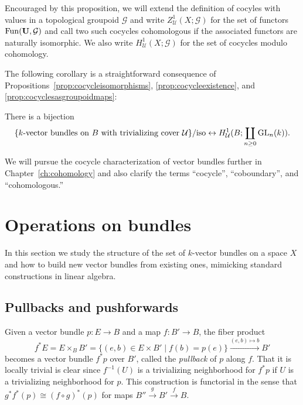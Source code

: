 \documentclass[a4paper,openany]{scrbook}
\begin{document}
Encouraged by this proposition, we will extend the definition of cocyles with values in a topological groupoid $\mathcal G$ and write $Z^1_{\mathcal U}(X;\mathcal G)$ for the set of functors $\operatorname{Fun}(\mathbf U,\mathcal G)$ and call two such cocycles cohomologous if the associated functors are naturally isomorphic. We also write $H^1_{\mathcal U}(X;\mathcal G)$ for the set of cocycles modulo cohomology.

The following corollary is a straightforward consequence of Propositions~\ref{prop:cocycleisomorphisms}, \ref{prop:cocycleexistence}, and \ref{prop:cocyclesasgroupoidmaps}:
\begin{corollary} \label{cor:cocycleidentification}
There is a bijection
\[
\{\text{$k$-vector bundles on $B$ with trivializing cover $\mathcal U$}\}/\text{iso} \leftrightarrow H^1_{\mathcal U}(B;\coprod_{n \geq 0} \operatorname{GL}_n(k)).
\]
\end{corollary}

We will pursue the cocycle characterization of vector bundles further in Chapter~\ref{ch:cohomology} and also clarify the terms “cocycle”, “coboundary”, and “cohomologous.”


\section{Operations on bundles}

In this section we study the structure of the set of $k$-vector bundles on a space $X$ and how to build new vector bundles from existing ones, mimicking standard constructions in linear algebra.

\subsection{Pullbacks and pushforwards} \label{subsec:pullback-pushforward}

Given a vector bundle $p\colon E \to B$ and a map $f\colon B' \to B$, the fiber product
\[
f^*E = E \times_B B' = \{(e,b) \in E \times B' \mid f(b) = p(e)\} \xrightarrow{(e,b) \mapsto b} B'
\]
becomes a vector bundle $f^*p$ over $B'$, called the \emph{pullback} of $p$ along $f$. That it is locally trivial is clear since $f^{-1}(U)$ is a trivializing neighborhood for $f^*p$ if $U$ is a trivializing neighborhood for $p$. This construction is functorial in the sense that $g^*f^*(p) \cong (f \circ g)^*(p)$ for maps $B'' \xrightarrow{g} B' \xrightarrow{f} B$.
\end{document}
